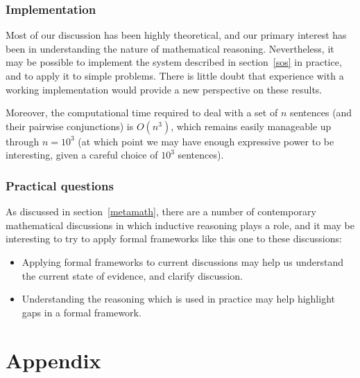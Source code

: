 \documentclass[12pt]{article}
\theoremstyle{definition}
\newif\iflater
\def\magicappendix{\latertrue \the\magicAppendix}
\begin{document}
\subsubsection{Implementation}

Most of our discussion has been highly theoretical, and our primary interest
has been in understanding the nature of mathematical reasoning.
Nevertheless, it may be possible to implement the system described in section~\ref{sos}
in practice, and to apply it to simple problems.
There is little doubt that experience with a working implementation
would provide a new perspective on these results.

Moreover, the computational time required to deal with a set of $n$ sentences
(and their pairwise conjunctions)
is $O(n^3)$, which remains easily manageable up through $n = 10^3$
(at which point we may have enough expressive power to be interesting,
given a careful choice of $10^3$ sentences).

\subsubsection{Practical questions}

As discussed in section~\ref{metamath}, there are a number
of contemporary mathematical discussions in which inductive
reasoning plays a role, and it may be interesting to try to apply
formal frameworks like this one to these discussions:
\begin{itemize}
\item Applying formal frameworks to current discussions
may help us understand the current state of evidence,
and clarify discussion.
\item Understanding the reasoning which is used in practice
may help highlight gaps in a formal framework.
\end{itemize}





\section{Appendix}

\magicappendix
\end{document}
